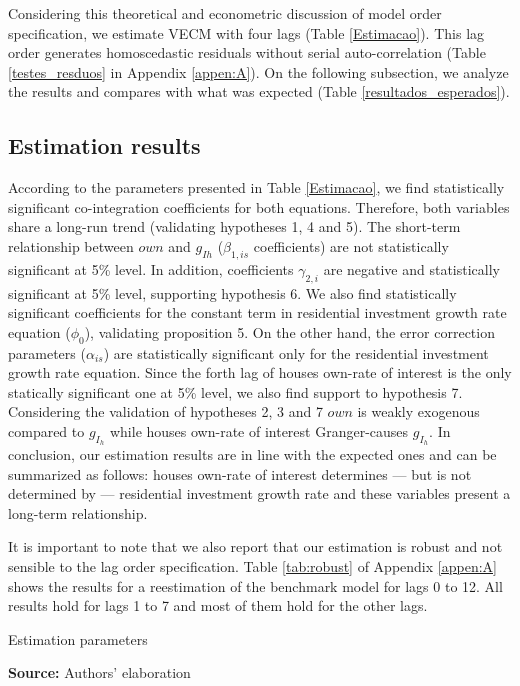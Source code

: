 \documentclass[12pt, a4paper]{article}
\begin{document}
Considering this theoretical and econometric discussion of model order specification, we estimate VECM with four lags  (Table \ref{Estimacao}).
This lag order generates homoscedastic residuals without serial auto-correlation (Table \ref{testes_resduos} in Appendix \ref{appen:A}).
On the following subsection, we analyze the results and compares with what was expected (Table \ref{resultados_esperados}).


\subsection{Estimation results}
\label{sec:org1f71955}
\label{sec:results}

According to the parameters presented in Table \ref{Estimacao}, we find statistically significant co-integration  coefficients for both equations.
Therefore, both variables share a long-run trend (validating hypotheses 1, 4 and 5).
The short-term relationship between \(own\) and \(g_{Ih}\) (\(\beta_{1, is}\) coefficients) are not statistically significant at 5\% level.
In addition, coefficients \(\gamma_{2,i}\) are negative and statistically significant at 5\% level, supporting hypothesis 6.
We also find statistically significant coefficients for the constant term in residential investment growth rate equation (\(\phi_0\)), validating proposition 5.
On the other hand, the error correction parameters (\(\alpha_{is}\)) are statistically significant only for the residential investment growth rate equation.
Since the forth lag of houses own-rate of interest is the only statically significant one at 5\% level, we also find support to hypothesis 7.
Considering the validation of hypotheses 2, 3 and 7 \(own\) is weakly exogenous compared to \(g_{I_h}\) while houses own-rate of interest Granger-causes \(g_{I_h}\).
In conclusion, our estimation results are in line with the expected ones and can be summarized as follows: houses own-rate of interest determines --- but is not determined by --- residential investment growth rate and these variables present a long-term relationship.

It is important to note that we also report that our estimation is robust and not sensible to the lag order specification.
Table \ref{tab:robust} of Appendix \ref{appen:A} shows the results for a reestimation of the benchmark model for lags 0 to 12.
All results hold for lags 1 to 7 and most of them hold for the other lags.


\begin{table}[H]
	\caption{Estimation parameters}
	\centering
	
	\caption*{\textbf{Source:} Authors' elaboration}
\end{table}
\end{document}
